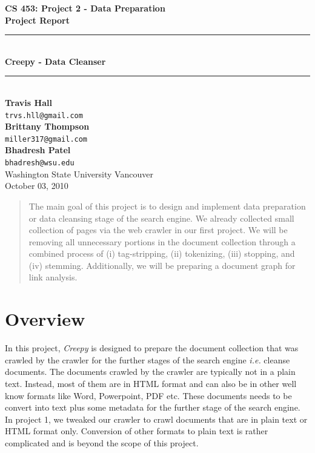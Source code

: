 \documentclass[letterpaper,11pt,twoside]{article}
\begin{document}
\begin{titlepage}
   \begin{center}
       {\Large \textbf{CS 453: Project 2 - Data Preparation}}\\[0.5cm]
       {\Large \textbf{Project Report}}\\[3.0cm]

       {\rule{\linewidth}{0.5mm}} \\[0.5cm]
       {\Huge \textbf{Creepy - Data Cleanser}}\\[0.4cm] 
       {\rule{\linewidth}{0.5mm}} \\[2.0cm]

       \textbf{Travis Hall}\\
       \texttt{trvs.hll@gmail.com}\\[0.5cm]
       \textbf{Brittany Thompson}\\
       \texttt{miller317@gmail.com}\\[0.5cm]
       \textbf{Bhadresh Patel}\\
       \texttt{bhadresh@wsu.edu}\\[0.5cm]

       \vfill
       Washington State University Vancouver\\
       October 03, 2010
   \end{center}
\end{titlepage}

\begin{abstract}
The main goal of this project is to design and implement data preparation or data cleansing stage of the search engine. We already collected small collection of pages via the web crawler in our first project. We will be removing all unnecessary portions in the document collection through a combined process of (i) tag-stripping, (ii) tokenizing, (iii) stopping, and (iv) stemming. Additionally, we will be preparing a document graph for link analysis. 
\end{abstract}

\section{Overview}
In this project, \emph{Creepy} is designed to prepare the document collection that was crawled by the crawler for the further stages of the search engine \emph{i.e.} cleanse documents. The documents crawled by the crawler are typically not in a plain text. Instead, most of them are in HTML format and can also be in other well know formats like Word, Powerpoint, PDF etc. These documents needs to be convert into text plus some metadata for the further stage of the search engine. In project 1, we tweaked our crawler to crawl documents that are in plain text or HTML format only. Conversion of other formats to plain text is rather complicated and is beyond the scope of this project.    
\end{document}
